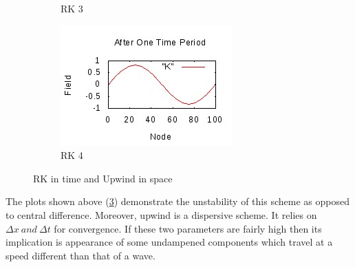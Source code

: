 \documentclass[a4paper,12pt]{report}
\begin{document}
\begin{figure}[h]
\begin{subfigure}[b]{0.4\textwidth}
                \caption{RK 3}
                \label{fig:rk3upw}
	\end{subfigure}
	\begin{subfigure}[b]{0.4\textwidth}
		\includegraphics[width=\textwidth]{rk3upw.jpeg}
                \caption{RK 4}
                \label{fig:rk4upw}
	\end{subfigure}
	\caption{RK in time and Upwind in space}
	\label{Upwind}
\end{figure}
The plots shown above (\ref{Upwind}) demonstrate the unstability of this scheme as opposed to central difference. Moreover, upwind is a dispersive scheme. It relies on $\Delta x\ and\ \Delta t$ for convergence. If these two parameters are fairly high then its implication is appearance of some undampened components which travel at a speed different than that of a wave. 
\end{document}
